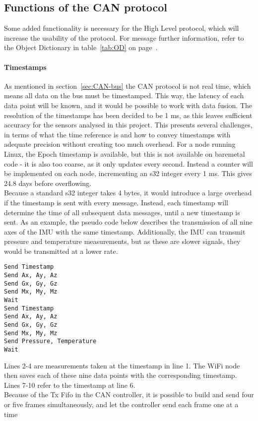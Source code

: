 \subsection{Functions of the CAN protocol}\label{sec:CAN_functions}
Some added functionality is necessary for the High Level protocol, which will increase the usability of the protocol.
For message further information, refer to the Object Dictionary in table~\ref{tab:OD} on page~\pageref{tab:OD}.

\paragraph*{Timestamps}
As mentioned in section~\ref{sec:CAN-bus} the CAN protocol is not real time, which means all data on the bus must be timestamped. 
This way, the latency of each data point will be known, and it would be possible to work with data fusion.
The resolution of the timestamps has been decided to be 1 ms, as this leaves sufficient accuracy for the sensors analysed in this project.
This presents several challenges, in terms of what the time reference is and how to convey timestamps with adequate precision without creating too much overhead. 
For a node running Linux, the Epoch timestamp is available, but this is not available on baremetal code - it is also too coarse, as it only updates every second.
Instead a counter will be implemented on each node, incrementing an s32 integer every 1 ms.
This gives 24.8 days before overflowing.\\

Because a standard s32 integer takes 4 bytes, it would introduce a large overhead if the timestamp is sent with every message. 
Instead, each timestamp will determine the time of all subsequent data messages, until a new timestamp is sent. 
As an example, the pseudo code below describes the transmission of all nine axes of the IMU with the same timestamp.
Additionally, the IMU can transmit pressure and temperature measurements, but as these are slower signals, they would be transmitted at a lower rate.

\begin{lstlisting}
Send Timestamp
Send Ax, Ay, Az
Send Gx, Gy, Gz
Send Mx, My, Mz
Wait
Send Timestamp
Send Ax, Ay, Az
Send Gx, Gy, Gz
Send Mx, My, Mz
Send Pressure, Temperature
Wait
\end{lstlisting}

Lines 2-4 are measurements taken at the timestamp in line 1.
The WiFi node then saves each of these nine data points with the corresponding timestamp.
Lines 7-10 refer to the timestamp at line 6.\\
Because of the Tx Fifo in the CAN controller, it is possible to build and send four or five frames simultaneously, and let the controller send each frame one at a time


